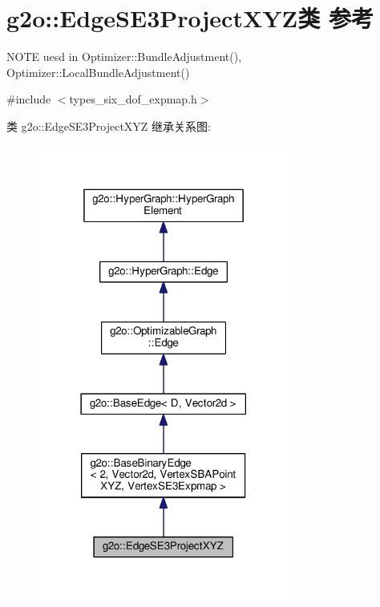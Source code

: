 \hypertarget{classg2o_1_1EdgeSE3ProjectXYZ}{\section{g2o\-:\-:Edge\-S\-E3\-Project\-X\-Y\-Z类 参考}
\label{classg2o_1_1EdgeSE3ProjectXYZ}
}


N\-O\-T\-E uesd in Optimizer\-::\-Bundle\-Adjustment(), Optimizer\-::\-Local\-Bundle\-Adjustment()  




{\ttfamily \#include $<$types\-\_\-six\-\_\-dof\-\_\-expmap.\-h$>$}



类 g2o\-:\-:Edge\-S\-E3\-Project\-X\-Y\-Z 继承关系图\-:
\nopagebreak
\begin{figure}[H]
\begin{center}
\leavevmode
\includegraphics[width=234pt]{classg2o_1_1EdgeSE3ProjectXYZ__inherit__graph}
\end{center}
\end{figure}


